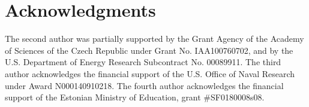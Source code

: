 \documentclass[mathpazo]{cicp}
\begin{document}


\maketitle









\section*{Acknowledgments}
The second author was partially supported by the Grant Agency of the Academy of 
Sciences of the Czech Republic under Grant No. IAA100760702, and by the U.S.
Department of Energy Research Subcontract No. 00089911. 
The third author acknowledges the financial support of the U.S. Office of Naval Research 
under Award N000140910218. The fourth author acknowledges the financial support of
the Estonian Ministry of Education, grant \#SF0180008s08.


\newpage

\end{document}
